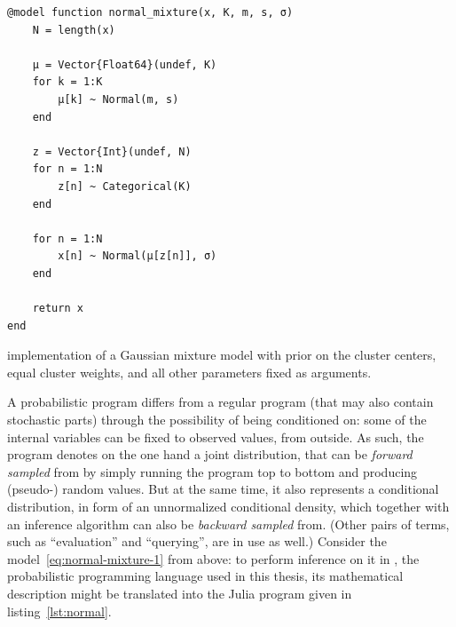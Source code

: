 \begin{lstfloat}[t]
  \begin{lstlisting}[style=lstfloat]
@model function normal_mixture(x, K, m, s, σ)
    N = length(x)

    μ = Vector{Float64}(undef, K)
    for k = 1:K
        μ[k] ~ Normal(m, s)
    end

    z = Vector{Int}(undef, N)
    for n = 1:N
        z[n] ~ Categorical(K)
    end

    for n = 1:N
        x[n] ~ Normal(μ[z[n]], σ)
    end

    return x
end
\end{lstlisting}
  \caption{\turingjl{} implementation of a Gaussian mixture model with prior on the cluster centers,
    equal cluster weights, and all other parameters fixed as arguments.\label{lst:normal}}
\end{lstfloat}

A probabilistic program differs from a regular program (that may also contain stochastic parts)
through the possibility of being conditioned on: some of the internal variables can be fixed to
observed values, from outside.  As such, the program denotes on the one hand a joint distribution,
that can be \emph{forward sampled} from by simply running the program top to bottom and producing
(pseudo-) random values.  But at the same time, it also represents a conditional distribution, in
form of an unnormalized conditional density, which together with an inference algorithm can also be
\emph{backward sampled} from.  (Other pairs of terms, such as \enquote{evaluation} and
\enquote{querying}, are in use as well.)  Consider the model~\eqref{eq:normal-mixture-1} from above:
to perform inference on it in \turingjl{} \parencite{ge2018turing}, the probabilistic programming
language used in this thesis, its mathematical description might be translated into the Julia
program given in listing~\ref{lst:normal}.

